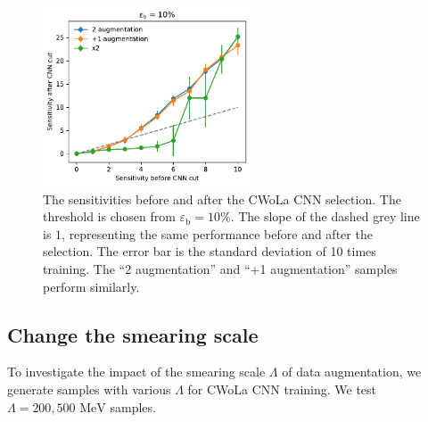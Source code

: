\documentclass[12pt]{article}
\begin{document}
        \begin{figure}[htpb]
            \centering
            \includegraphics[width=0.55\textwidth]{HVmodel_sensitivity_improvement_bkg_eff_10_only_aug_2.pdf}
            \caption{The sensitivities before and after the CWoLa CNN selection. The threshold is chosen from $\varepsilon_{\text{b}} = 10\%$. The slope of the dashed grey line is $1$, representing the same performance before and after the selection. The error bar is the standard deviation of 10 times training. The ``2 augmentation'' and ``+1 augmentation'' samples perform similarly.}
            \label{fig:sensitivity_improvement_bkg_eff_01_only_aug_2}
        \end{figure}
    \subsection{Change the smearing scale}%
    \label{sub:change_the_smearing_scale}
        To investigate the impact of the smearing scale $\Lambda$ of data augmentation, we generate samples with various $\Lambda$ for CWoLa CNN training. We test $\Lambda = 200, 500 \text{ MeV}$ samples.
\end{document}
